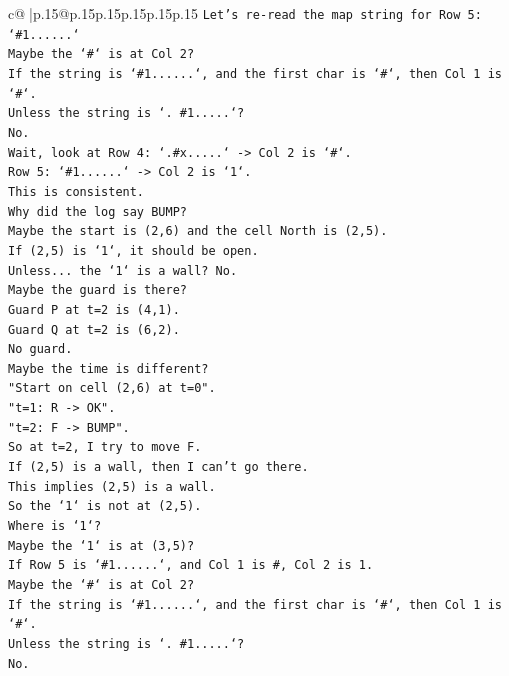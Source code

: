 \documentclass{article}
\begin{document}
{\begin{supertabular}{c@{$\;$}|p{.15\linewidth}@{}p{.15\linewidth}p{.15\linewidth}p{.15\linewidth}p{.15\linewidth}p{.15\linewidth}}
{{{\texttt{Let's re{-}read the map string for Row 5: `\#1......`} \\
\texttt{Maybe the `\#` is at Col 2?} \\
\texttt{If the string is `\#1......`, and the first char is `\#`, then Col 1 is `\#`.} \\
\texttt{Unless the string is `. \#1.....`?} \\
\texttt{No.} \\
\texttt{Wait, look at Row 4: `.\#x.....` {-}> Col 2 is `\#`.} \\
\texttt{Row 5: `\#1......` {-}> Col 2 is `1`.} \\
\texttt{This is consistent.} \\
\texttt{Why did the log say BUMP?} \\
\texttt{Maybe the start is (2,6) and the cell North is (2,5).} \\
\texttt{If (2,5) is `1`, it should be open.} \\
\texttt{Unless... the `1` is a wall? No.} \\
\texttt{Maybe the guard is there?} \\
\texttt{Guard P at t=2 is (4,1).} \\
\texttt{Guard Q at t=2 is (6,2).} \\
\texttt{No guard.} \\
\texttt{Maybe the time is different?} \\
\texttt{"Start on cell (2,6) at t=0".} \\
\texttt{"t=1: R {-}> OK".} \\
\texttt{"t=2: F {-}> BUMP".} \\
\texttt{So at t=2, I try to move F.} \\
\texttt{If (2,5) is a wall, then I can't go there.} \\
\texttt{This implies (2,5) is a wall.} \\
\texttt{So the `1` is not at (2,5).} \\
\texttt{Where is `1`?} \\
\texttt{Maybe the `1` is at (3,5)?} \\
\texttt{If Row 5 is `\#1......`, and Col 1 is \#, Col 2 is 1.} \\
\texttt{Maybe the `\#` is at Col 2?} \\
\texttt{If the string is `\#1......`, and the first char is `\#`, then Col 1 is `\#`.} \\
\texttt{Unless the string is `. \#1.....`?} \\
\texttt{No.} \\
}}}
\end{supertabular}}
\end{document}
